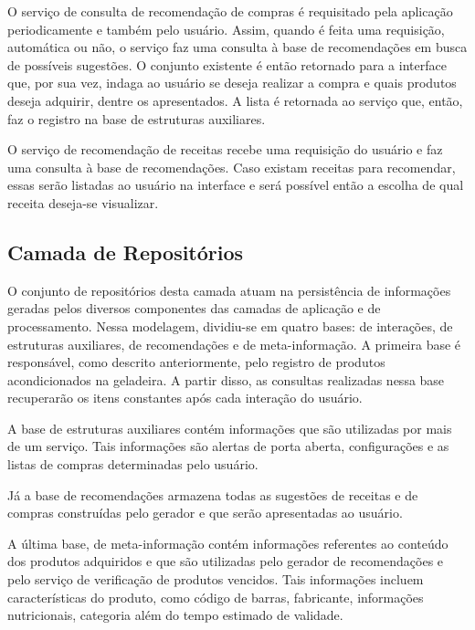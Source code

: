 
O serviço de consulta de recomendação de compras é requisitado pela aplicação periodicamente e também pelo usuário. Assim, quando é feita uma requisição, automática ou não, o serviço faz uma consulta à base de recomendações em busca de possíveis sugestões. O conjunto existente é então retornado para a interface que, por sua vez, indaga ao usuário se deseja realizar a compra e quais produtos deseja adquirir, dentre os apresentados. A lista é retornada ao serviço que, então, faz o registro na base de estruturas auxiliares.


O serviço de recomendação de receitas recebe uma requisição do usuário e faz uma consulta à base de recomendações. Caso existam receitas para recomendar, essas serão listadas ao usuário na interface e será possível então a escolha de qual receita deseja-se visualizar.


\subsection{Camada de Repositórios}\label{sec:camada-repo}

O conjunto de repositórios desta camada atuam na persistência de informações geradas pelos diversos componentes das camadas de aplicação e de processamento. Nessa modelagem, dividiu-se em quatro bases: de interações, de estruturas auxiliares, de recomendações e de meta-informação.
A primeira base é responsável, como descrito anteriormente, pelo registro de produtos acondicionados na geladeira. A partir disso, as consultas realizadas nessa base recuperarão os itens constantes após cada interação do usuário.

A base de estruturas auxiliares contém informações que são utilizadas por mais de um serviço. Tais informações são alertas de porta aberta, configurações e as listas de compras determinadas pelo usuário. 

Já a base de recomendações armazena todas as sugestões de receitas e de compras construídas pelo gerador e que serão apresentadas ao usuário.

A última base, de meta-informação contém informações referentes ao conteúdo dos produtos adquiridos e que são utilizadas pelo gerador de recomendações e pelo serviço de verificação de produtos vencidos. Tais informações incluem características do produto, como código de barras, fabricante, informações nutricionais, categoria além do tempo estimado de validade.

